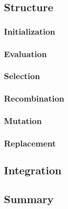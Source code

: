 \documentclass[10pt]{amsart}
\begin{document}
\begin{multicols}{2}
  \subsection{Structure}%
  \label{sub:structure}

  \subsubsection{Initialization}%
  \label{ssub:initialization}

  \subsubsection{Evaluation}%
  \label{ssub:evaluation}

  \subsubsection{Selection}%
  \label{ssub:selection}

  \subsubsection{Recombination}%
  \label{ssub:recombination}

  \subsubsection{Mutation}%
  \label{ssub:mutation}

  \subsubsection{Replacement}%
  \label{ssub:replacement}

  \subsection{Integration}%
  \label{sub:integration}

  \subsection{Summary}%
  \label{sub:summaryb}

\end{multicols}
\end{document}
